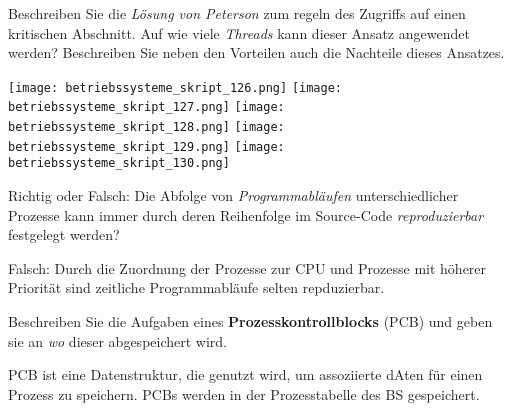 \documentclass{article}
\begin{document}
\begin{tcolorbox}[colback=white!10!white,colframe=lightgray!75!black,
  savelowerto=\jobname_ex.tex]

\begin{center}
Beschreiben Sie die 
\textit{Lösung von Peterson
} zum regeln des Zugriffs auf einen kritischen Abschnitt. Auf wie viele 
\textit{Threads
} kann dieser Ansatz angewendet werden? Beschreiben Sie neben den Vorteilen auch die Nachteile dieses Ansatzes.

\end{center}

\tcblower

\justifying
\texttt{[image: betriebssysteme\_skript\_126.png]}
\texttt{[image: betriebssysteme\_skript\_127.png]}
\texttt{[image: betriebssysteme\_skript\_128.png]}
\texttt{[image: betriebssysteme\_skript\_129.png]}
\texttt{[image: betriebssysteme\_skript\_130.png]}

\end{tcolorbox}
\begin{tcolorbox}[colback=white!10!white,colframe=lightgray!75!black,
  savelowerto=\jobname_ex.tex]

\begin{center}
Richtig oder Falsch: Die Abfolge von 
\textit{Programmabläufen
} unterschiedlicher Prozesse kann immer durch deren Reihenfolge im Source-Code 
\textit{reproduzierbar
} festgelegt werden?

\end{center}

\tcblower

\justifying
Falsch: Durch die Zuordnung der Prozesse zur CPU und Prozesse mit höherer Priorität sind zeitliche Programmabläufe selten repduzierbar.

\end{tcolorbox}
\begin{tcolorbox}[colback=white!10!white,colframe=lightgray!75!black,
  savelowerto=\jobname_ex.tex]

\begin{center}
Beschreiben Sie die Aufgaben eines 
\textbf{Prozesskontrollblocks
} (PCB) und geben sie an 
\textit{wo
} dieser abgespeichert wird.

\end{center}

\tcblower

\justifying
PCB ist eine Datenstruktur, die genutzt wird, um assoziierte dAten für einen Prozess zu speichern.
PCBs werden in der Prozesstabelle des BS gespeichert.

\end{tcolorbox}
\end{document}
